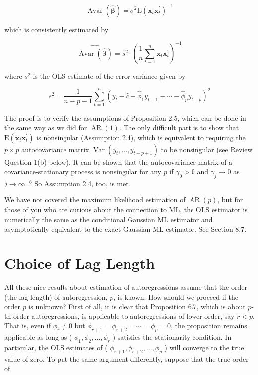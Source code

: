 \documentclass[10pt]{article}
\begin{document}
$$
\operatorname{Avar}(\widehat{\boldsymbol{\beta}})=\sigma^{2} \mathrm{E}\left(\mathbf{x}_{t} \mathbf{x}_{t}^{\prime}\right)^{-1}
$$

which is consistently estimated by

$$
\widehat{\operatorname{Avar}(\widehat{\boldsymbol{\beta}})}=s^{2} \cdot\left(\frac{1}{n} \sum_{t=1}^{n} \mathbf{x}_{t} \mathbf{x}_{t}^{\prime}\right)^{-1}
$$

where $s^{2}$ is the OLS estimate of the error variance given by


\begin{equation*}
s^{2}=\frac{1}{n-p-1} \sum_{t=1}^{n}\left(y_{t}-\hat{c}-\hat{\phi}_{1} y_{t-1}-\cdots-\hat{\phi}_{p} y_{t-p}\right)^{2} \tag{6.4.5}
\end{equation*}


The proof is to verify the assumptions of Proposition 2.5, which can be done in the same way as we did for $\operatorname{AR}(1)$. The only difficult part is to show that $\mathrm{E}\left(\mathbf{x}_{t} \mathbf{x}_{t}^{\prime}\right)$ is nonsingular (Assumption 2.4), which is equivalent to requiring the $p \times p$ autocovariance matrix $\operatorname{Var}\left(y_{t}, \ldots, y_{t-p+1}\right)$ to be nonsingular (see Review Question 1(b) below). It can be shown that the autocovariance matrix of a covariance-stationary process is nonsingular for any $p$ if $\gamma_{0}>0$ and $\gamma_{j} \rightarrow 0$ as $j \rightarrow \infty$. ${ }^{6}$ So Assumption 2.4, too, is met.

We have not covered the maximum likelihood estimation of $\operatorname{AR}(p)$, but for those of you who are curious about the connection to ML, the OLS estimator is numerically the same as the conditional Gaussian ML estimator and asymptotically equivalent to the exact Gaussian ML estimator. See Section 8.7.

\section*{Choice of Lag Length}
All these nice results about estimation of autoregressions assume that the order (the lag length) of autoregression, $p$, is known. How should we proceed if the order $p$ is unknown? First of all, it is clear that Proposition 6.7, which is about $p$-th order autoregressions, is applicable to autoregressions of lower order, say $r<p$. That is, even if $\phi_{r} \neq 0$ but $\phi_{r+1}=\phi_{r+2}=\cdots=\phi_{p}=0$, the proposition remains applicable as long as ( $\phi_{1}, \phi_{2}, \ldots, \phi_{r}$ ) satisfies the stationarity condition. In particular, the OLS estimates of ( $\phi_{r+1}, \phi_{r+2}, \ldots, \phi_{p}$ ) will converge to the true value of zero. To put the same argument differently, suppose that the true order of
\end{document}
